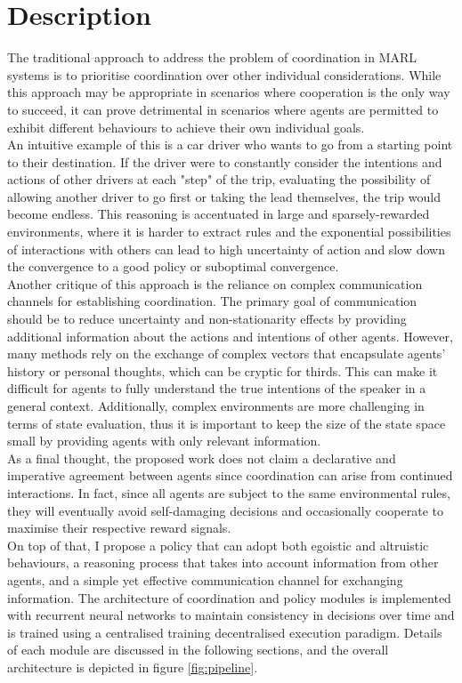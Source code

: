 \documentclass[a4paper,singleside,12pt]{report} %
\begin{document}
\section{Description}\label{description}
The traditional approach to address the problem of coordination in MARL systems is to prioritise coordination over other individual considerations. While this approach may be appropriate in scenarios where cooperation is the only way to succeed, it can prove detrimental in scenarios where agents are permitted to exhibit different behaviours to achieve their own individual goals.\\
An intuitive example of this is a car driver who wants to go from a starting point to their destination. If the driver were to constantly consider the intentions and actions of other drivers at each "step" of the trip, evaluating the possibility of allowing another driver to go first or taking the lead themselves, the trip would become endless. This reasoning is accentuated in large and sparsely-rewarded environments, where it is harder to extract rules and the exponential possibilities of interactions with others can lead to high uncertainty of action and slow down the convergence to a good policy or suboptimal convergence.\\
Another critique of this approach is the reliance on complex communication channels for establishing coordination. The primary goal of communication should be to reduce uncertainty and non-stationarity effects by providing additional information about the actions and intentions of other agents. However, many methods rely on the exchange of complex vectors that encapsulate agents' history or personal thoughts, which can be cryptic for thirds. This can make it difficult for agents to fully understand the true intentions of the speaker in a general context. Additionally, complex environments are more challenging in terms of state evaluation, thus it is important to keep the size of the state space small by providing agents with only relevant information.\\
As a final thought, the proposed work does not claim a declarative and imperative agreement between agents since coordination can arise from continued interactions. In fact, since all agents are subject to the same environmental rules, they will eventually avoid self-damaging decisions and occasionally cooperate to maximise their respective reward signals.\\
On top of that, I propose a policy that can adopt both egoistic and altruistic behaviours, a reasoning process that takes into account information from other agents, and a simple yet effective communication channel for exchanging information. The architecture of coordination and policy modules is implemented with recurrent neural networks to maintain consistency in decisions over time and is trained using a centralised training decentralised execution paradigm. Details of each module are discussed in the following sections, and the overall architecture is depicted in figure \ref{fig:pipeline}.
\end{document}
